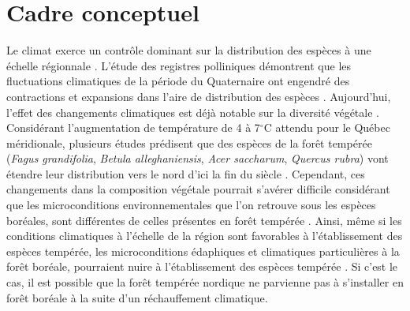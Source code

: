 \section*{Cadre conceptuel}

Le climat exerce un contrôle dominant sur la distribution des espèces à une échelle régionnale
\citep{Pearson2003b}. L'étude des registres polliniques démontrent que les fluctuations climatiques
de la période du Quaternaire ont engendré des contractions et expansions dans l'aire de distribution
des espèces \citep{Davis2001}. Aujourd'hui, l'effet des changements climatiques est déjà notable sur
la diversité végétale \citep{Walther2002a,Parmesan2006}. Considérant l'augmentation de température
de 4 à 7$^\circ$C \citep[Scénario RCP 8.5]{Climatique2015} attendu pour le Québec méridionale,
plusieurs études prédisent que des espèces de la forêt tempérée (\textit{Fagus grandifolia},
\textit{Betula alleghaniensis}, \textit{Acer saccharum}, \textit{Quercus rubra}) vont étendre leur
distribution vers le nord d'ici la fin du siècle \citep{Iverson2002,Sciences2014}. Cependant, ces
changements dans la composition végétale pourrait s'avérer difficile considérant que les
microconditions environnementales que l’on retrouve sous les espèces boréales, sont différentes de
celles présentes en forêt tempérée \citep{Barras1998,Caspersen2005}. Ainsi, même si les conditions
climatiques à l'échelle de la région sont favorables à l'établissement des espèces tempérée, les
microconditions édaphiques et climatiques particulières à la forêt boréale, pourraient nuire à
l'établissement des espèces tempérée \citep{DeFrenne2013,Lafleur2010}. Si c’est le cas, il est
possible que la forêt tempérée nordique ne parvienne pas à s'installer en forêt boréale à la suite
d’un réchauffement climatique.

